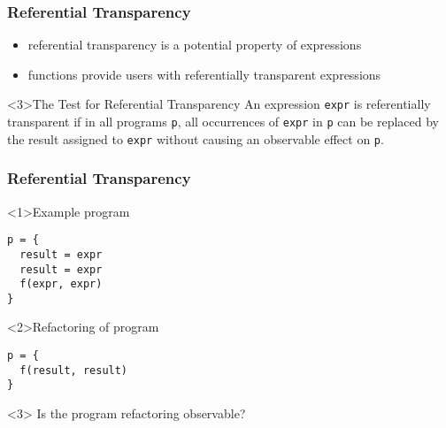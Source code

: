 \begin{frame}
\frametitle{Referential Transparency}
\begin{itemize}
  \item<1> referential transparency is a potential property of expressions
  \item<2> functions provide users with referentially transparent expressions
\end{itemize}
\begin{block}<3>{The Test for Referential Transparency}
An expression \lstinline$expr$ is referentially transparent if in all programs \lstinline$p$, all occurrences of \lstinline$expr$ in \lstinline$p$ can be replaced by the result assigned to \lstinline$expr$ without causing an observable effect on \lstinline$p$.
\end{block}
\end{frame}

\begin{frame}[fragile]
\frametitle{Referential Transparency}
\begin{block}<1>{Example program}
\begin{lstlisting}
p = {
  result = expr
  result = expr
  f(expr, expr)
}
\end{lstlisting}
\end{block}
\begin{block}<2>{Refactoring of program}
\begin{lstlisting}
p = {
  f(result, result)
}
\end{lstlisting}
\end{block}
\begin{block}<3>{}
Is the program refactoring observable?
\end{block}
\end{frame}
